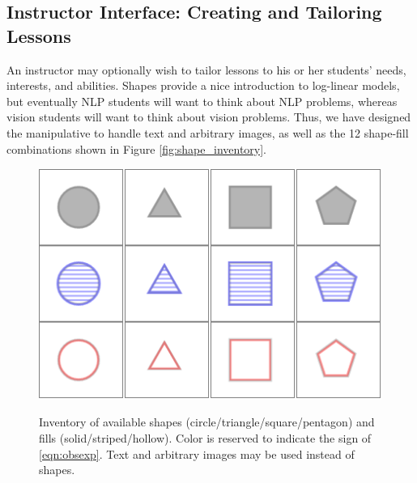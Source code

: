 \documentclass[11pt,letterpaper]{article}
\begin{document}
\subsection{Instructor Interface: Creating and Tailoring Lessons}\label{sec:tailoring}

An instructor may optionally wish to tailor lessons to his or her
students' needs, interests, and abilities.  Shapes provide a nice
introduction to log-linear models, but eventually NLP students will
want to think about NLP problems, whereas vision students will want to
think about vision problems.  Thus, we have designed the manipulative
to handle text and arbitrary images, as well as the 12 shape-fill
combinations shown in Figure \ref{fig:shape_inventory}.

\begin{figure}[t]
\begin{center}
\centering
\includegraphics[scale=.5]{images/different_shapes_fills3x4.PNG}
\caption{Inventory of available shapes
  (circle/triangle/square/pentagon) and fills (solid/striped/hollow).
  Color is reserved to indicate the sign of \eqref{eqn:obsexp}.  Text
  and arbitrary images may be used instead of shapes.}
\label{fig:shape_inventory}
\label{fig:inventory}
\end{center}
\end{figure}
\end{document}
